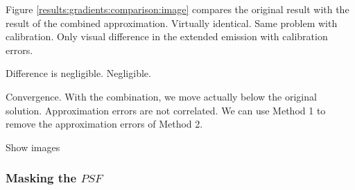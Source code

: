 Figure \ref{results:gradients:comparison:image} compares the original result with the result of the combined approximation. Virtually identical. Same problem with calibration. Only visual difference in the extended emission with calibration errors. 


Difference is negligible.
Negligible.

Convergence. With the combination, we move actually below the original solution. 
Approximation errors are not correlated. We can use Method 1 to remove the approximation errors of Method 2.



Show images

\subsubsection{Masking the $PSF$}
